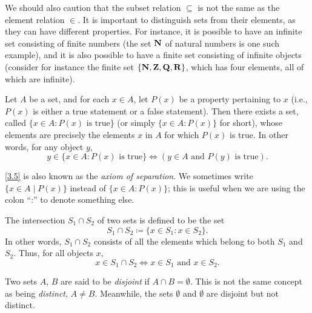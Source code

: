 \begin{remark}\label{3.1.21}
  We should also caution that the subset relation \(\subseteq\) is not the same as the element relation \(\in\).
  It is important to distinguish sets from their elements, as they can have different properties.
  For instance, it is possible to have an infinite set consisting of finite numbers (the set \(\mathbf{N}\) of natural numbers is one such example), and it is also possible to have a finite set consisting of infinite objects
  (consider for instance the finite set \(\{\mathbf{N}, \mathbf{Z}, \mathbf{Q}, \mathbf{R}\}\), which has four elements, all of which are infinite).
\end{remark}

\begin{axiom}\label{3.5}
  Let \(A\) be a set, and for each \(x \in A\), let \(P(x)\) be a property pertaining to \(x\) (i.e., \(P(x)\) is either a true statement or a false statement).
  Then there exists a set, called \(\{x \in A : P(x) \text{ is true}\}\) (or simply \(\{x \in A : P(x)\}\) for short), whose elements are precisely the elements \(x\) in \(A\) for which \(P(x)\) is true.
  In other words, for any object \(y\),
  \[
    y \in \{x \in A : P(x) \text{ is true}\} \iff (y \in A \text{ and } P(y) \text{ is true}).
  \]
\end{axiom}

\begin{note}
  \cref{3.5} is also known as the \emph{axiom of separation}.
  We sometimes write \(\{x \in A \mid P(x)\}\) instead of \(\{x \in A : P(x)\}\);
  this is useful when we are using the colon ``:'' to denote something else.
\end{note}

\setcounter{theorem}{22}
\begin{definition}[Intersections]\label{3.1.23}
  The intersection \(S_1 \cap S_2\) of two sets is defined to be the set
  \[
    S_1 \cap S_2 \coloneqq \{x \in S_1 : x \in S_2\}.
  \]
  In other words, \(S_1 \cap S_2\) consists of all the elements which belong to both \(S_1\) and \(S_2\).
  Thus, for all objects \(x\),
  \[
    x \in S_1 \cap S_2 \iff x \in S_1 \text{ and } x \in S_2.
  \]
\end{definition}

\begin{note}
  Two sets \(A\), \(B\) are said to be \emph{disjoint} if \(A \cap B = \emptyset\).
  This is not the same concept as being \emph{distinct}, \(A \neq B\).
  Meanwhile, the sets \(\emptyset\) and \(\emptyset\) are disjoint but not distinct.
\end{note}

